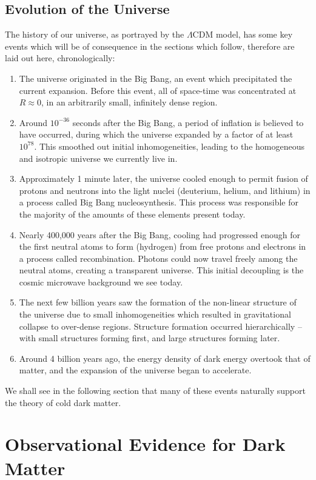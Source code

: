 \documentclass{report}
\begin{document}
\subsection{Evolution of the Universe}
The history of our universe, as portrayed by the $\Lambda$CDM model, has some key events which will be of consequence in the sections which follow, therefore are laid out here, chronologically:
\begin{enumerate}
\item The universe originated in the Big Bang, an event which precipitated the current expansion. Before this event, all of space-time was concentrated at $R \approx 0$, in an arbitrarily small, infinitely dense region.
\item Around $10^{-36}$ seconds after the Big Bang, a period of inflation is believed to have occurred, during which the universe expanded by a factor of at least $10^{78}$. This smoothed out initial inhomogeneities, leading to the homogeneous and isotropic universe we currently live in.
\item Approximately 1 minute later, the universe cooled enough to permit fusion of protons and neutrons into the light nuclei (deuterium, helium, and lithium) in a process called Big Bang nucleosynthesis. This process was responsible for the majority of the amounts of these elements present today.
\item Nearly 400,000 years after the Big Bang, cooling had progressed enough for the first neutral atoms to form (hydrogen) from free protons and electrons in a process called recombination. Photons could now travel freely among the neutral atoms, creating a transparent universe. This initial decoupling is the cosmic microwave background we see today.
\item The next few billion years saw the formation of the non-linear structure of the universe due to small inhomogeneities which resulted in gravitational collapse to over-dense regions. Structure formation occurred hierarchically -- with small structures forming first, and large structures forming later.
\item Around 4 billion years ago, the energy density of dark energy overtook that of matter, and the expansion of the universe began to accelerate.
\end{enumerate}

We shall see in the following section that many of these events naturally support the theory of cold dark matter.

\section{Observational Evidence for Dark Matter}
\end{document}
